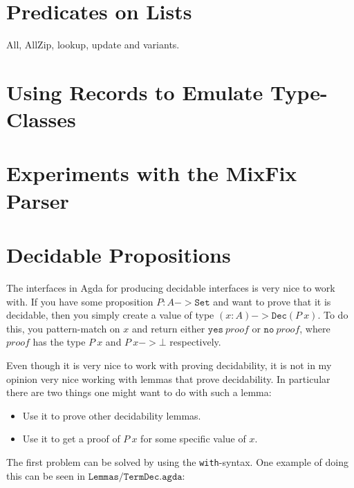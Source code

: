 \section{Predicates on Lists}
All, AllZip, lookup, update and variants.

\section{Using Records to Emulate Type-Classes}

\section{Experiments with the MixFix Parser}

\section{Decidable Propositions}

The interfaces in Agda for producing decidable interfaces is very nice to work
with. If you have some proposition $P : A -> \mathtt{Set}$ and want to prove
that it is decidable, then you simply create a value of type
$(x : A) -> \mathtt{Dec} (P\ x)$. To do this, you pattern-match on $x$ and
return either $\mathtt{yes}\ proof$ or $\mathtt{no}\ proof$, where $proof$ has
the type $P\ x$ and $P\ x -> \bot$ respectively.

Even though it is very nice to work with proving decidability, it is not in my
opinion very nice working with lemmas that prove decidability. In particular
there are two things one might want to do with such a lemma:

\begin{itemize}
\item Use it to prove other decidability lemmas.
\item Use it to get a proof of $P\ x$ for some specific value of $x$.
\end{itemize}

The first problem can be solved by using the \texttt{with}-syntax. One example
of doing this can be seen in $\texttt{Lemmas/TermDec.agda}$:

